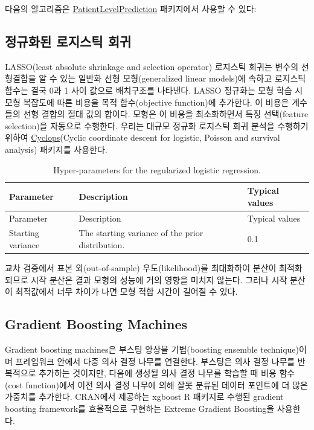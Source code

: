 \documentclass[11pt]{book}
\theoremstyle{definition}
\theoremstyle{definition}
\theoremstyle{definition}
\theoremstyle{remark}
\begin{document}
다음의 알고리즘은
\href{https://ohdsi.github.io/PatientLevelPrediction/}{PatientLevelPrediction}
패키지에서 사용할 수 있다:

\subsection{정규화된 로지스틱 회귀}\label{--}

LASSO(least absolute shrinkage and selection operator) 로지스틱 회귀는
변수의 선형결합을 알 수 있는 일반화 선형 모형(generalized linear
models)에 속하고 로지스틱 함수는 결국 0과 1 사이 값으로 배치구조를
나타낸다. LASSO 정규화는 모형 학습 시 모형 복잡도에 따른 비용을 목적
함수(objective function)에 추가한다. 이 비용은 계수들의 선형 결합의 절대
값의 합이다. 모형은 이 비용을 최소화하면서 특징 선택(feature
selection)을 자동으로 수행한다. 우리는 대규모 정규화 로지스틱 회귀
분석을 수행하기 위하여
\href{https://ohdsi.github.io/Cyclops/}{Cyclops}(Cyclic coordinate
descent for logistic, Poisson and survival analysis) 패키지를 사용한다.
  

\begin{longtable}[]{@{}lll@{}}
\caption{\label{tab:lassoParameters} Hyper-parameters for the regularized
logistic regression.}\tabularnewline
\toprule
Parameter & Description & Typical values\tabularnewline
\midrule
\endfirsthead
\toprule
Parameter & Description & Typical values\tabularnewline
\midrule
\endhead
Starting variance & The starting variance of the prior distribution. &
0.1\tabularnewline
\bottomrule
\end{longtable}

교차 검증에서 표본 외(out-of-sample) 우도(likelihood)를 최대화하여
분산이 최적화되므로 시작 분산은 결과 모형의 성능에 거의 영향을 미치지
않는다. 그러나 시작 분산이 최적값에서 너무 차이가 나면 모형 적합 시간이
길어질 수 있다.  

\subsection{Gradient Boosting
Machines}\label{gradient-boosting-machines}

Gradient boosting machines은 부스팅 앙상블 기법(boosting ensemble
technique)이며 프레임워크 안에서 다중 의사 결정 나무를 연결한다.
부스팅은 의사 결정 나무를 반복적으로 추가하는 것이지만, 다음에 생성될
의사 결정 나무를 학습할 때 비용 함수(cost function)에서 이전 의사 결정
나무에 의해 잘못 분류된 데이터 포인트에 더 많은 가중치를 추가한다.
CRAN에서 제공하는 xgboost R 패키지로 수행된 gradient boosting
framework를 효율적으로 구현하는 Extreme Gradient Boosting을 사용한다.
 
\end{document}
